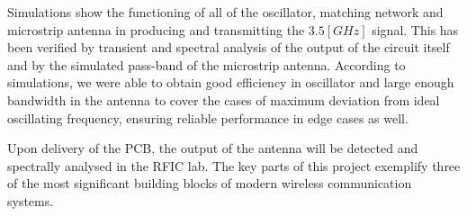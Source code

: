 Simulations show the functioning of all of the oscillator, matching network and microstrip antenna in producing and transmitting the \(3.5[GHz]\) signal. This has been verified by transient and spectral analysis of the output of the circuit itself and by the simulated pass-band of the microstrip antenna. According to simulations, we were able to obtain good efficiency in oscillator and large enough bandwidth in the antenna to cover the cases of maximum deviation from ideal oscillating frequency, ensuring reliable performance in edge cases as well. \par


Upon delivery of the PCB, the output of the antenna will be detected and spectrally analysed in the RFIC lab. The key parts of this project exemplify three of the most significant building blocks of modern wireless communication systems.